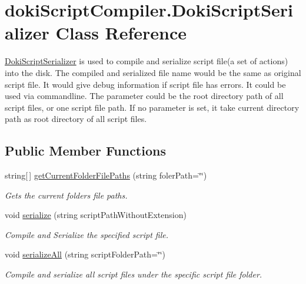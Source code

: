 \hypertarget{classdoki_script_compiler_1_1_doki_script_serializer}{}\section{doki\+Script\+Compiler.\+Doki\+Script\+Serializer Class Reference}
\label{classdoki_script_compiler_1_1_doki_script_serializer}


\hyperlink{classdoki_script_compiler_1_1_doki_script_serializer}{Doki\+Script\+Serializer} is used to compile and serialize script file(a set of actions) into the disk. The compiled and serialized file name would be the same as original script file. It would give debug information if script file has errors. It could be used via commandline. The parameter could be the root directory path of all script files, or one script file path. If no parameter is set, it take current directory path as root directory of all script files.  


\subsection*{Public Member Functions}
\begin{DoxyCompactItemize}
\item 
string\mbox{[}$\,$\mbox{]} \hyperlink{classdoki_script_compiler_1_1_doki_script_serializer_a92f821096288d7b69c4bfc9d5302b934}{get\+Current\+Folder\+File\+Paths} (string foler\+Path=\char`\"{}\char`\"{})
\begin{DoxyCompactList}\small\item\em Gets the current folder\textquotesingle{}s file paths. \end{DoxyCompactList}\item 
void \hyperlink{classdoki_script_compiler_1_1_doki_script_serializer_a0fd5840253f2fa5140c72c4ed31119a9}{serialize} (string script\+Path\+Without\+Extension)
\begin{DoxyCompactList}\small\item\em Compile and Serialize the specified script file. \end{DoxyCompactList}\item 
void \hyperlink{classdoki_script_compiler_1_1_doki_script_serializer_a8935ab99681261f9ae78f28687f9534e}{serialize\+All} (string script\+Folder\+Path=\char`\"{}\char`\"{})
\begin{DoxyCompactList}\small\item\em Compile and serialize all script files under the specific script file folder. \end{DoxyCompactList}\end{DoxyCompactItemize}
